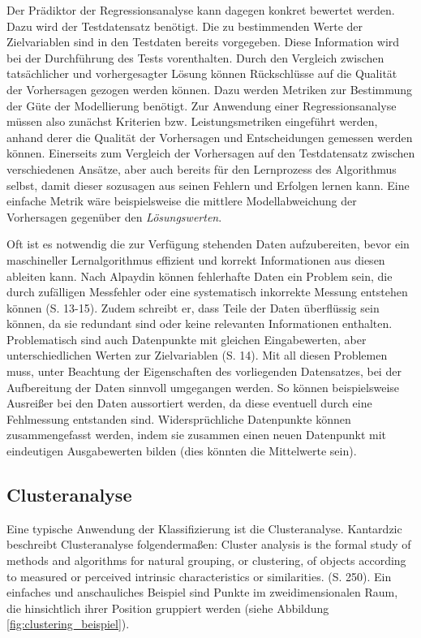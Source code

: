 \documentclass[
	12pt,
	a4paper,
	BCOR10mm,
	DIV14,
	listof=totoc,
	bibliography=totoc,
	headsepline
]{scrreprt}
\begin{document}
Der Prädiktor der Regressionsanalyse kann dagegen konkret bewertet werden. Dazu wird der Testdatensatz benötigt. Die zu bestimmenden Werte der Zielvariablen sind in den Testdaten bereits vorgegeben.
Diese Information wird bei der Durchführung des Tests vorenthalten. Durch den Vergleich zwischen tatsächlicher und vorhergesagter Lösung können Rückschlüsse auf die Qualität der Vorhersagen gezogen werden können. Dazu werden Metriken zur Bestimmung der Güte der Modellierung benötigt.
Zur Anwendung einer Regressionsanalyse müssen also zunächst Kriterien bzw. Leistungsmetriken eingeführt werden, anhand derer die Qualität der Vorhersagen und Entscheidungen gemessen werden können. Einerseits zum Vergleich der Vorhersagen auf den Testdatensatz zwischen verschiedenen Ansätze, aber auch bereits für den Lernprozess des Algorithmus selbst, damit dieser sozusagen aus seinen Fehlern und Erfolgen lernen kann. Eine einfache Metrik wäre beispielsweise die mittlere Modellabweichung der Vorhersagen gegenüber den \textit{Lösungswerten}.
\medskip

Oft ist es notwendig die zur Verfügung stehenden Daten aufzubereiten, bevor ein maschineller Lernalgorithmus effizient und korrekt Informationen aus diesen ableiten kann.
Nach Alpaydin können fehlerhafte Daten ein Problem sein, die durch zufälligen Messfehler oder eine systematisch inkorrekte Messung entstehen können \cite{Alpaydin:2010:IML:1734076} (S. 13-15). Zudem schreibt er, dass Teile der Daten überflüssig sein können, da sie redundant sind oder keine relevanten Informationen enthalten. Problematisch sind auch Datenpunkte mit gleichen Eingabewerten, aber unterschiedlichen Werten zur Zielvariablen \cite{Alpaydin:2010:IML:1734076} (S. 14).
Mit all diesen Problemen muss, unter Beachtung der Eigenschaften des vorliegenden Datensatzes, bei der Aufbereitung der Daten sinnvoll umgegangen werden. So können beispielsweise Ausreißer bei den Daten aussortiert werden, da diese eventuell durch eine Fehlmessung entstanden sind. Widersprüchliche Datenpunkte können zusammengefasst werden, indem sie zusammen einen neuen Datenpunkt mit eindeutigen Ausgabewerten bilden (dies könnten die Mittelwerte sein).

\subsection{Clusteranalyse}
Eine typische Anwendung der Klassifizierung ist die Clusteranalyse.
Kantardzic beschreibt Clusteranalyse folgendermaßen: \glqq Cluster analysis is the formal study of methods and algorithms for natural grouping, or clustering, of objects according to measured or perceived intrinsic characteristics or similarities.\grqq{} \cite{kantardzic2011data} (S. 250). Ein einfaches und anschauliches Beispiel sind Punkte im zweidimensionalen Raum, die hinsichtlich ihrer Position gruppiert werden (siehe Abbildung \ref{fig:clustering_beispiel}).
\end{document}

